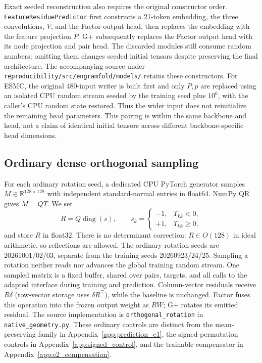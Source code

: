 Exact seeded reconstruction also requires the original constructor order.
\texttt{FeatureResiduePredictor} first constructs a 21-token embedding,
the three convolutions, $V$, and the Factor output head, then replaces the
embedding with the feature projection $P$. G+ subsequently replaces the
Factor output head with its node projection and pair head. The discarded
modules still consume random numbers; omitting them changes seeded initial
tensors despite preserving the final architecture. The accompanying source
under \texttt{reproducibility/src/engramfold/models/} retains these
constructors. For ESMC, the original 480-input writer is built first and
only $P,p$ are replaced using an isolated CPU random stream seeded by the
training seed plus $10^6$, with the caller's CPU random state restored.
Thus the wider input does not reinitialize the remaining head parameters.
This pairing is within the same backbone and head, not a claim of identical
initial tensors across different backbone-specific head dimensions.

\subsection{Ordinary dense orthogonal sampling}
\label{app:rotation_sampling}
For each ordinary rotation seed, a dedicated CPU PyTorch generator samples
$M\in\mathbb R^{128\times128}$ with independent standard-normal entries
in float64. NumPy QR gives $M=QT$. We set
\begin{equation}
 R=Q\operatorname{diag}(s),\qquad
 s_k=\begin{cases}-1,&T_{kk}<0,\\+1,&T_{kk}\ge0,\end{cases}
\end{equation}
and store $R$ in float32. There is no determinant correction:
$R\in O(128)$ in ideal arithmetic, so reflections are allowed.
The ordinary rotation seeds are 20261001/02/03, separate from the training
seeds 20260923/24/25. Sampling a rotation neither reads nor advances the
global training random stream. One sampled matrix is a fixed buffer,
shared over pairs, targets, and all calls to the adapted interface during
training and prediction. Column-vector residuals receive $R\delta$
(row-vector storage uses $\delta R^\top$), while the baseline is unchanged.
Factor fuses this operation into the frozen output weight as $RW$; G+
rotates its emitted residual. The source implementation is
\texttt{orthogonal\_rotation} in \texttt{native\_geometry.py}.
These ordinary controls are distinct from the mean-preserving family in
Appendix~\ref{app:prediction_e1}, the signed-permutation controls in
Appendix~\ref{app:signed_control}, and
the trainable compensator in Appendix~\ref{app:e2_compensation}.
